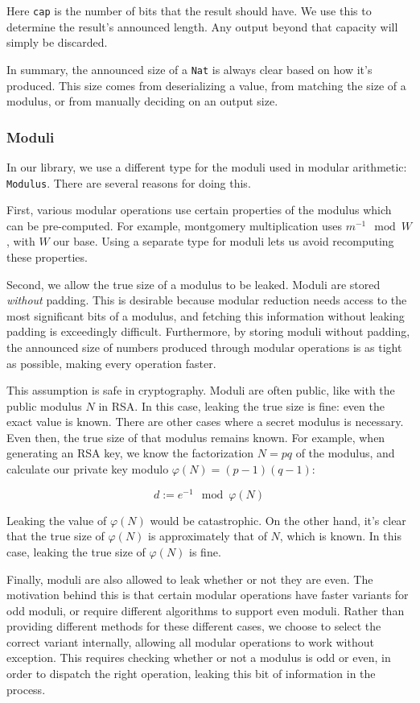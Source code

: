 \documentclass[11pt, a4paper]{article} %
\begin{document}
{Here \texttt{cap} is the number of bits that the result should have.
We use this to determine the result's announced length. Any output
beyond that capacity will simply be discarded.

In summary, the announced size of a \texttt{Nat} is always
clear based on how it's produced.
This size comes from deserializing
a value, from matching the size of a modulus, or from manually
deciding on an output size.

\subsubsection{Moduli}

In our library, we use a different type for
the moduli used in modular arithmetic: \texttt{Modulus}. There are several
reasons for doing this.

First, various modular operations use certain properties
of the modulus which can be pre-computed. For example, montgomery multiplication
uses $m^{-1} \mod W$, with $W$ our base.
Using a separate type for moduli lets us avoid
recomputing these properties.

Second, we allow the true size of a modulus to be leaked.
Moduli are stored \emph{without} padding.
This is desirable because modular reduction needs access to the most
significant bits of a modulus, and fetching this information without
leaking padding is exceedingly difficult. Furthermore,
by storing moduli without padding, the announced size of numbers produced
through modular operations is as tight as possible, making
every operation faster.

This assumption is safe in cryptography. Moduli are often public,
like with the public modulus $N$ in RSA. In this case, leaking
the true size is fine: even the exact value is known. There
are other cases where a secret modulus is necessary.
Even then, the true size of that modulus remains known. For example,
when generating an RSA key, we know the factorization $N = pq$ of the modulus,
and calculate our private key modulo $\varphi(N) = (p - 1)(q - 1)$:

$$
d := e^{-1} \mod \varphi(N)
$$

Leaking the value of $\varphi(N)$ would be catastrophic. On the other hand,
it's clear that the true size of $\varphi(N)$ is approximately
that of $N$, which is known. In this case, leaking the true size of
$\varphi(N)$ is fine.

Finally, moduli are also allowed to leak whether or not
they are even. The motivation behind this is that certain modular
operations have faster variants for odd moduli, or require
different algorithms to support even moduli. Rather than
providing different methods for these different cases, we choose
to select the correct variant internally, allowing all modular
operations to work without exception. This requires
checking whether or not a modulus is odd or even, in order
to dispatch the right operation, leaking this bit of
information in the process.

}
\end{document}
